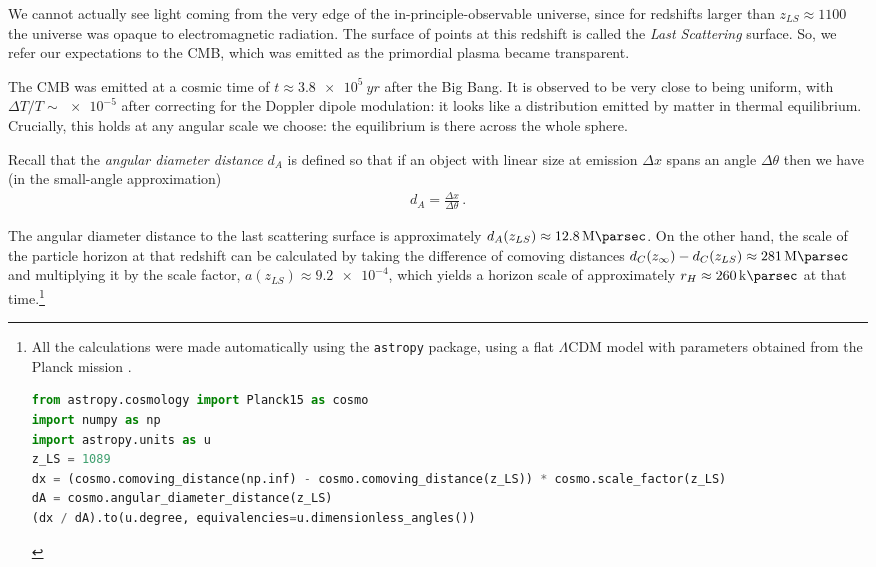 \documentclass[main.tex]{subfiles}
\begin{document}
We cannot actually see light coming from the very edge of the in-principle-observable universe, since for redshifts larger than \(z _{LS} \approx 1100\) the universe was opaque to electromagnetic radiation. The surface of points at this redshift is called the \emph{Last Scattering} surface. So, we refer our expectations to the CMB, which was emitted as the primordial plasma became transparent. 






The CMB was emitted at a cosmic time of \(t \approx \SI{3.8e5}{yr}\) after the Big Bang.
It is observed to be very close to being uniform, with \(\Delta T / T \sim \num{e-5}\) after correcting for the Doppler dipole modulation: 
it looks like a distribution emitted by matter in thermal equilibrium.
Crucially, this holds at any angular scale we choose: the equilibrium is there across the whole sphere.

Recall that the \emph{angular diameter distance} \(d_A\) is defined so that if an object with linear size at emission \(\Delta x\) spans an angle \(\Delta \theta \) then we have (in the small-angle approximation) 
%
\begin{align}
d_A = \frac{\Delta x}{\Delta \theta }
\,.
\end{align}

The angular diameter distance to the last scattering surface  is approximately \(d_A (z_{LS}) \approx \SI{12.8}{\mega\parsec}\).
On the other hand, the scale of the particle horizon at that redshift can be calculated by taking the difference of comoving distances \( d_C(z_\infty) - d_C(z_{LS}) \approx \SI{281}{\mega\parsec}\) and multiplying it by the scale factor, \(a(z_{LS}) \approx \num{9.2e-4}\), which yields a horizon scale of approximately \(r_H \approx \SI{260}{\kilo\parsec}\) at that time.\cprotect\footnote{All the calculations were made automatically using the \texttt{astropy} package, using a flat \(\Lambda \)CDM model with parameters obtained from the Planck mission \cite[]{PlanckCollaboration:2016XIII}.
\begin{lstlisting}[language=Python]
from astropy.cosmology import Planck15 as cosmo
import numpy as np
import astropy.units as u
z_LS = 1089
dx = (cosmo.comoving_distance(np.inf) - cosmo.comoving_distance(z_LS)) * cosmo.scale_factor(z_LS)
dA = cosmo.angular_diameter_distance(z_LS)
(dx / dA).to(u.degree, equivalencies=u.dimensionless_angles())
\end{lstlisting}}
\end{document}
